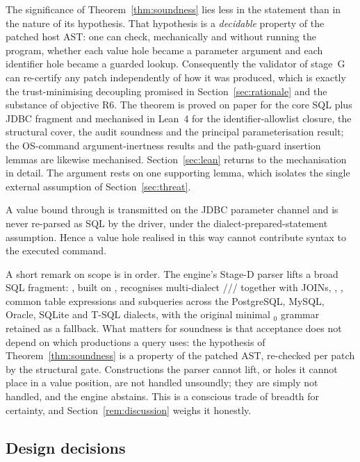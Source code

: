 The significance of Theorem~\ref{thm:soundness} lies less in the statement
than in the nature of its hypothesis. That hypothesis is a \emph{decidable}
property of the patched host AST: one can check, mechanically and without
running the program, whether each value hole became a parameter argument and
each identifier hole became a guarded lookup. Consequently the validator of
stage~G can re-certify any patch independently of how it was produced,
which is exactly the trust-minimising decoupling promised in
Section~\ref{sec:rationale} and the substance of objective R6. The theorem
is proved on paper for the core SQL plus JDBC fragment and mechanised in
Lean~4 for the identifier-allowlist closure, the structural cover, the audit
soundness and the principal parameterisation result; the OS-command
argument-inertness results and the path-guard insertion lemmas are likewise
mechanised. Section~\ref{sec:lean} returns to the mechanisation in detail.
The argument rests on one supporting lemma, which isolates the single
external assumption of Section~\ref{sec:threat}.

\begin{lemma}
\label{lem:inertness}
A value bound through  is transmitted on the
JDBC parameter channel and is never re-parsed as SQL by the driver, under
the dialect-prepared-statement assumption. Hence a \textsf{value} hole
realised in this way cannot contribute syntax to the executed command.
\end{lemma}

A short remark on scope is in order. The engine's Stage-D parser lifts a
broad SQL fragment: , built on , recognises
multi-dialect ///
together with JOINs, , , common table
expressions and subqueries across the PostgreSQL, MySQL, Oracle, SQLite and
T-SQL dialects, with the original minimal $_0$ grammar retained as
a fallback. What matters for soundness is that acceptance does not depend on
which productions a query uses: the hypothesis of
Theorem~\ref{thm:soundness} is a property of the patched AST, re-checked per
patch by the structural gate. Constructions the parser cannot lift, or holes
it cannot place in a value position, are not handled unsoundly; they are
simply not handled, and the engine abstains. This is a conscious trade of
breadth for certainty, and Section~\ref{rem:discussion} weighs it honestly.

\subsection{Design decisions}
\label{sec:decisions}

